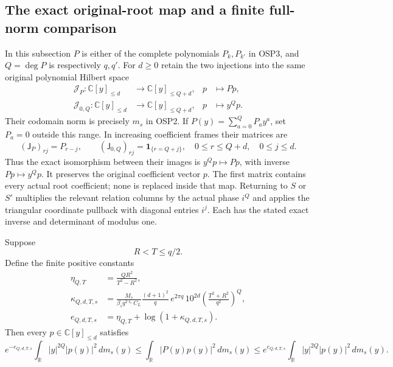 \documentclass[11pt,a4paper]{article}
\begin{document}
\subsection{The exact original-root map and a finite full-norm comparison}

In this subsection $P$ is either of the complete polynomials
$P_k,P_{k'}$ in OSP3, and $Q=\deg P$ is respectively $q,q'$.
For $d\ge0$ retain the two injections into the same original
polynomial Hilbert space
\[
\begin{aligned}
\mathcal J_P:\mathbb C[y]_{\le d}&\longrightarrow
          \mathbb C[y]_{\le Q+d},&p&\longmapsto Pp,\\
\mathcal J_{0,Q}:\mathbb C[y]_{\le d}&\longrightarrow
          \mathbb C[y]_{\le Q+d},&p&\longmapsto y^Qp .
\end{aligned}\tag{OSP16}
\]
Their codomain norm is precisely $m_s$ in OSP2.
If $P(y)=\sum_{a=0}^QP_a y^a$, set $P_a=0$ outside this range.
In increasing coefficient frames their matrices are
\[
(\mathsf J_P)_{rj}=P_{r-j},\qquad
(\mathsf J_{0,Q})_{rj}=\mathbf1_{\{r=Q+j\}},
\quad 0\le r\le Q+d,\quad 0\le j\le d.
\tag{OSP17}
\]
Thus the exact isomorphism between their images is
$y^Qp\mapsto Pp$, with inverse $Pp\mapsto y^Qp$.
It preserves the original coefficient vector $p$. The first
matrix contains every actual root coefficient; none is replaced
inside that map. Returning to $S$ or $S'$ multiplies the relevant
relation columns by the actual phase $i^Q$ and applies the
triangular coordinate pullback with diagonal entries $i^j$.
Each has the stated exact inverse and determinant of modulus one.

Suppose
\[
R<T\le q/2.
\tag{OSP18}
\]
Define the finite positive constants
\[
\begin{split}
\eta_{Q,T}&=\frac{Q R^2}{T^2-R^2},\\
\kappa_{Q,d,T,s}
 &=\frac{M_s}{\beta_s q^{2\ell_s}C_L}
    \frac{(d+1)^2}{q}\,
    e^{2\pi q}\,10^{2d}
             \left(\frac{T^2+R^2}{q^2}\right)^Q,\\
e_{Q,d,T,s}&=\eta_{Q,T}+\log(1+\kappa_{Q,d,T,s}).
\end{split}\tag{OSP19}
\]
Then every $p\in\mathbb C[y]_{\le d}$ satisfies
\[
e^{-e_{Q,d,T,s}}\int_{\mathbb R}|y|^{2Q}|p(y)|^2\,dm_s(y)
\le\int_{\mathbb R}|P(y)p(y)|^2\,dm_s(y)
\le e^{e_{Q,d,T,s}}
      \int_{\mathbb R}|y|^{2Q}|p(y)|^2\,dm_s(y).
\tag{OSP20}
\]
\end{document}
